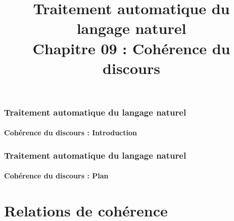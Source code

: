 \documentclass[xcolor=table]{beamer}
\title[TALN : 09- Cohérence du discours]%
{Traitement automatique du langage naturel\\Chapitre 09 : Cohérence du discours}
\begin{document}
	
\begin{frame}
\frametitle{Traitement automatique du langage naturel}
\framesubtitle{Cohérence du discours : Introduction}

%

\end{frame}

%
%

\begin{frame}
\frametitle{Traitement automatique du langage naturel}
\framesubtitle{Cohérence du discours : Plan}

\begin{multicols}{2}
\tableofcontents
\end{multicols}
\end{frame}

\section{Relations de cohérence}
\end{document}
